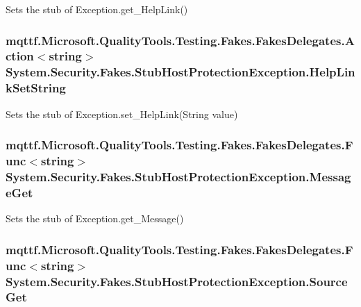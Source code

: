 Sets the stub of Exception.\-get\-\_\-\-Help\-Link()

\hypertarget{class_system_1_1_security_1_1_fakes_1_1_stub_host_protection_exception_acd34ff0797c3bd4060785e628eab89b3}{
\subsubsection[{Help\-Link\-Set\-String}]{\setlength{\rightskip}{0pt plus 5cm}mqttf.\-Microsoft.\-Quality\-Tools.\-Testing.\-Fakes.\-Fakes\-Delegates.\-Action$<$string$>$ System.\-Security.\-Fakes.\-Stub\-Host\-Protection\-Exception.\-Help\-Link\-Set\-String}}\label{class_system_1_1_security_1_1_fakes_1_1_stub_host_protection_exception_acd34ff0797c3bd4060785e628eab89b3}


Sets the stub of Exception.\-set\-\_\-\-Help\-Link(\-String value)

\hypertarget{class_system_1_1_security_1_1_fakes_1_1_stub_host_protection_exception_a4a0501ce5471051e22f8c560a76ef5d7}{
\subsubsection[{Message\-Get}]{\setlength{\rightskip}{0pt plus 5cm}mqttf.\-Microsoft.\-Quality\-Tools.\-Testing.\-Fakes.\-Fakes\-Delegates.\-Func$<$string$>$ System.\-Security.\-Fakes.\-Stub\-Host\-Protection\-Exception.\-Message\-Get}}\label{class_system_1_1_security_1_1_fakes_1_1_stub_host_protection_exception_a4a0501ce5471051e22f8c560a76ef5d7}


Sets the stub of Exception.\-get\-\_\-\-Message()

\hypertarget{class_system_1_1_security_1_1_fakes_1_1_stub_host_protection_exception_abf66d3fd92e8326c73788f9723482f8f}{
\subsubsection[{Source\-Get}]{\setlength{\rightskip}{0pt plus 5cm}mqttf.\-Microsoft.\-Quality\-Tools.\-Testing.\-Fakes.\-Fakes\-Delegates.\-Func$<$string$>$ System.\-Security.\-Fakes.\-Stub\-Host\-Protection\-Exception.\-Source\-Get}}\label{class_system_1_1_security_1_1_fakes_1_1_stub_host_protection_exception_abf66d3fd92e8326c73788f9723482f8f}


